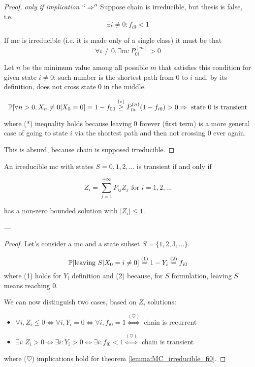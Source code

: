 	\begin{proof} \emph{only if implication} $``\Rightarrow''$
		Suppose chain is irreducible, but thesis is false, i.e.
		$$ \exists i \neq 0 : f_{i0} < 1 $$

		If \gls{mc} is irreducible (i.e. it is made only of a single class) it must be that
		$$ \forall i \neq 0, \exists m : P_{0i}^{(m)} > 0 $$

		Let $n$ be the minimum value among all possible $m$  that satisfies this condition for given state $i \neq 0$: such number is the shortest path from 0 to $i$ and, by its definition, does not cross state 0 in the middle.

		$$ \mathbb{P}[\forall n>0, X_n \neq 0 | X_0 = 0] = 1 - f_{00} \stackrel{(*)}{\ge} P_{0i}^{(n)} (1 - f_{i0}) > 0 \Rightarrow \text{ state 0 is transient} $$

		where (*) inequality holds because leaving 0 forever (first term) is a more general case of going to state $i$ via the shortest path and then not crossing 0 ever again.

		This is absurd, because chain is supposed irreducible.
	\end{proof}

	\begin{theorem}[4.14]
		An irreducible \gls{mc} with states $S = 0, 1, 2, ...$ is transient if and only if

		$$ Z_i = \sum_{j=1}^{+\infty} P_{ij} Z_j \text{ for } i = 1, 2, ...$$

		has a non-zero bounded solution with $ |Z_i| \le 1$.
	\end{theorem}
	---
	\begin{proof}
		Let's consider a \gls{mc} and a state subset $S = \{1, 2, 3, ...\}$.

		$$ \mathbb{P}[\text{leaving } S| X_0 = i \neq 0] \stackrel{(1)}{=}
			1 - Y_i \stackrel{(2)}{=} f_{i0} $$
		where (1) holds for $Y_i$ definition and (2) because, for $S$ formulation, leaving $S$ means reaching 0.

		We can now distinguish two cases, based on $Z_i$ solutions:
		\begin{itemize}
			\item $ \forall i, Z_i \le 0 \Leftrightarrow \forall i, Y_i = 0 \Leftrightarrow \forall i, f_{i0} = 1 \stackrel{(\heartsuit)}{\Leftrightarrow} $ chain is recurrent

			\item $ \exists i: Z_i > 0 \Leftrightarrow \exists i: Y_i > 0 \Leftrightarrow \exists i: f_{i0} < 1 \stackrel{(\heartsuit)}{\Leftrightarrow} $ chain is transient
		\end{itemize}
		where ($\heartsuit$) implications hold for theorem \ref{lemma:MC_irreducible_fi0}.
	\end{proof}

